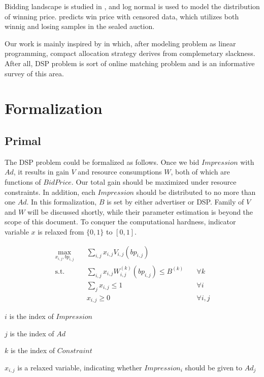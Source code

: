 \documentclass{article}
\theoremstyle{definition}
\newcommand{\sumj}{\sum\limits_j}
\newcommand{\sumij}{\sum\limits_{i,j}}
\newcommand{\sx}{x_{i,j}}
\newcommand{\sbp}{bp_{i,j}}
\newcommand{\sV}{V_{i,j}}
\newcommand{\sW}{W_{i,j}^{(k)}}
\newcommand{\sB}{B^{(k)}}
\newcommand{\dspresourceconstraint}{\sumij \sx \sW(\sbp) \le \sB}
\newcommand{\assignmentconstraint}{\sumj \sx \le 1}
\begin{document}
\begin{CJK}{UTF8}{gbsn}
Bidding landscape is studied in \cite{YingCui2011}, and log normal is used to model the distribution of winning price.
\cite{Wu2015} predicts win price with censored data, which utilizes both winnig and losing samples in the sealed auction.

Our work is mainly inspired by \cite{YeChen2011} in which,
    after modeling problem as linear programming,
    compact allocation strategy derives from complemetary slackness.
After all, DSP problem is sort of online matching problem and \cite{Mehta} is an informative survey of this area.

\newpage
\section{Formalization}

\subsection{Primal}

The DSP problem could be formalized as follows.
Once we bid $Impression$ with $Ad$, it results in gain $V$ and resource consumptions $W$, both of which are functions of $BidPrice$.
Our total gain should be maximized under resource constraints.
In addition, each $Impression$ should be distributed to no more than one $Ad$.
In this formalization, $B$ is set by either advertiser or DSP.
Family of $V$ and $W$ will be discussed shortly, while their parameter estimation is beyond the scope of this document.
To conquer the computational hardness, indicator variable $x$ is relaxed from $\{0, 1\}$ to $[0, 1]$.

\begin{alignat}{2}
    \max\limits_{\sx, \sbp} \quad & \sumij \sx \sV(\sbp) \quad    & {} \\
    \mbox{s.t.} \quad             & \dspresourceconstraint \quad  & \forall k \\
    \quad                         & \assignmentconstraint \quad   & \forall i \\
    \quad                         & \sx \ge 0 \quad               & \forall i,j
\end{alignat}

$i$ is the index of $Impression$

$j$ is the index of $Ad$

$k$ is the index of $Constraint$

$\sx$ is a relaxed variable, indicating whether $Impression_i$ should be given to $Ad_j$


\end{CJK}
\end{document}
